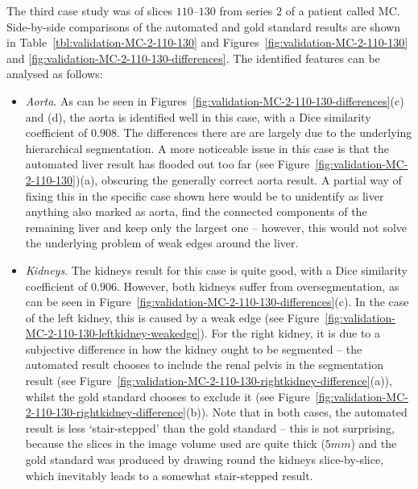 \fi

The third case study was of slices $110$--$130$ from series $2$ of a patient called MC. Side-by-side comparisons of the automated and gold standard results are shown in Table~\ref{tbl:validation-MC-2-110-130} and Figures~\ref{fig:validation-MC-2-110-130} and \ref{fig:validation-MC-2-110-130-differences}. The identified features can be analysed as follows:
%
\begin{itemize}

\item \emph{Aorta}. As can be seen in Figures~\ref{fig:validation-MC-2-110-130-differences}(c) and (d), the aorta is identified well in this case, with a Dice similarity coefficient of $0.908$. The differences there are are largely due to the underlying hierarchical segmentation. A more noticeable issue in this case is that the automated liver result has flooded out too far (see Figure~\ref{fig:validation-MC-2-110-130})(a), obscuring the generally correct aorta result. A partial way of fixing this in the specific case shown here would be to unidentify as liver anything also marked as aorta, find the connected components of the remaining liver and keep only the largest one -- however, this would not solve the underlying problem of weak edges around the liver.

\item \emph{Kidneys}. The kidneys result for this case is quite good, with a Dice similarity coefficient of $0.906$. However, both kidneys suffer from oversegmentation, as can be seen in Figure~\ref{fig:validation-MC-2-110-130-differences}(c). In the case of the left kidney, this is caused by a weak edge (see Figure~\ref{fig:validation-MC-2-110-130-leftkidney-weakedge}). For the right kidney, it is due to a subjective difference in how the kidney ought to be segmented -- the automated result chooses to include the renal pelvis in the segmentation result (see Figure~\ref{fig:validation-MC-2-110-130-rightkidney-difference}(a)), whilst the gold standard chooses to exclude it (see Figure~\ref{fig:validation-MC-2-110-130-rightkidney-difference}(b)). Note that in both cases, the automated result is less `stair-stepped' than the gold standard -- this is not surprising, because the slices in the image volume used are quite thick ($5\mathit{mm}$) and the gold standard was produced by drawing round the kidneys slice-by-slice, which inevitably leads to a somewhat stair-stepped result.


\end{itemize}
